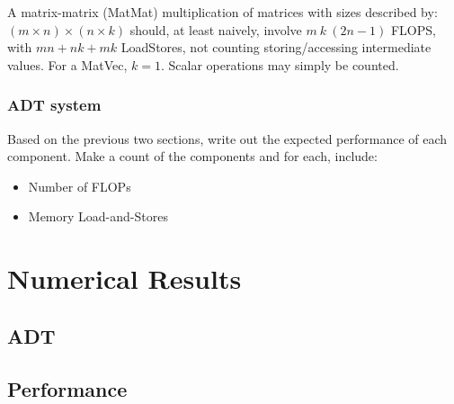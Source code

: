 \documentclass[11pt]{article}
\begin{document}
A matrix-matrix (MatMat) multiplication of matrices with sizes described by:  $(m \times n) \times (n \times k)$ should, at least naively, involve $m~k~(2n - 1)$ FLOPS, with $mn+nk+mk$ LoadStores, not counting storing/accessing intermediate values.  For a MatVec, $k=1$.  Scalar operations may simply be counted.
\subsubsection{ADT system}
Based on the previous two sections, write out the expected performance of each component.  Make a count of the
components and for each, include:
\begin{itemize}
\item Number of FLOPs
\item Memory Load-and-Stores
\end{itemize}

\section{Numerical Results}
\subsection{ADT}
\subsection{Performance}
\end{document}
